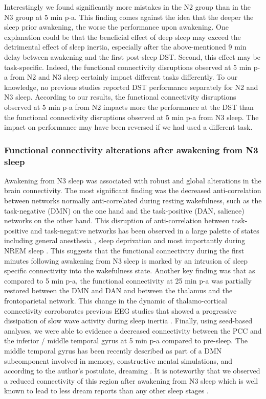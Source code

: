 Interestingly we found significantly more mistakes in the N2 group than in the N3 group at 5 min p-a. This finding comes against the idea that the deeper the sleep prior awakening, the worse the performance upon awakening. One explanation could be that the beneficial effect of deep sleep may exceed the detrimental effect of sleep inertia, especially after the above-mentioned 9 min delay between awakening and the first post-sleep DST. Second, this effect may be task-specific. Indeed, the functional connectivity disruptions observed at 5 min p-a from N2 and N3 sleep certainly impact different tasks differently. To our knowledge, no previous studies reported DST performance separately for N2 and N3 sleep. According to our results, the functional connectivity disruptions observed at 5 min p-a from N2 impacts more the performance at the DST than the functional connectivity disruptions observed at 5 min p-a from N3 sleep. The impact on performance may have been reversed if we had used a different task.

\subsubsection*{Functional connectivity alterations after awakening from N3 sleep}
Awakening from N3 sleep was associated with robust and global alterations in the brain connectivity. The most significant finding was the decreased anti-correlation between networks normally anti-correlated during resting wakefulness, such as the task-negative (DMN) on the one hand and the task-positive (DAN, salience) networks on the other hand. This disruption of anti-correlation between task-positive and task-negative networks has been observed in a large palette of states including general anesthesia \citep{boveroux_breakdown_2010}, sleep deprivation \citep{de_havas_sleep_2012, samann_increased_2010, wang_spontaneous_2016} and most importantly during NREM sleep \citep{larson-prior_modulation_2011, samann_development_2011}. This suggests that the functional connectivity during the first minutes following awakening from N3 sleep is marked by an intrusion of sleep specific connectivity into the wakefulness state. Another key finding was that as compared to 5 min p-a, the functional connectivity at 25 min p-a was partially restored between the DMN and DAN and between the thalamus and the frontoparietal network. This change in the dynamic of thalamo-cortical connectivity corroborates previous EEG studies that showed a progressive dissipation of slow wave activity during sleep inertia \citep{ogilvie_falling_1992, ferrara_electroencephalographic_2006, marzano_recalling_2011, gorgoni_eeg_2015}. Finally, using seed-based analyses, we were able to evidence a decreased connectivity between the PCC and the inferior / middle temporal gyrus at 5 min p-a compared to pre-sleep. The middle temporal gyrus has been recently described as part of a DMN subcomponent involved in memory, constructive mental simulations, and according to the author’s postulate, dreaming \citep{christoff_mind-wandering_2016}. It is noteworthy that we observed a reduced connectivity of this region after awakening from N3 sleep which is well known to lead to less dream reports than any other sleep stages \citep{nielsen_review_2000, ruby_experimental_2011}.

